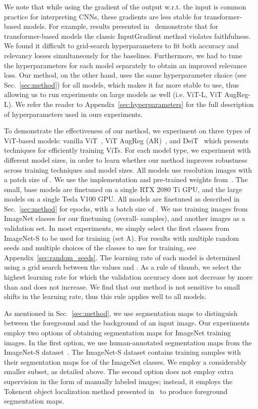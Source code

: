 \documentclass{article}
\begin{document}
We note that while using the gradient of the output w.r.t. the input is common practice for interpreting CNNs, these gradients are less stable for transformer-based models. For example, results presented in~\cite{Liu2022RethinkingAE} demonstrate that for transformer-based models the classic InputGradient method violates faithfulness. We found it difficult to grid-search hyperparameters to fit both accuracy and relevancy losses simultaneously for the baselines. Furthermore, we had to tune the hyperparameters for each model separately to obtain an improved relevance loss. Our method, on the other hand, uses the same hyperparameter choice (see Sec.~\ref{sec:method}) for all models, which makes it far more stable to use, thus allowing us to run experiments on large models as well (i.e. ViT-L, ViT AugReg-L). We refer the reader to Appendix~\ref{sec:hyperparameters} for the full description of hyperparameters used in ours experiments. 

 To demonstrate the effectiveness of our method, we experiment on three types of ViT-based models: vanilla ViT~\cite{dosovitskiy2020image}, ViT AugReg (AR)~\cite{Steiner2021HowTT}, and DeiT~\cite{Touvron2021TrainingDI} which presents techniques for efficiently training ViTs. For each model type, we experiment with different model sizes, in order to learn whether our method improves robustness across training techniques and model sizes. 
All models use  resolution images with a patch size of . We use the implementation and pre-trained weights from~\cite{rw2019timm}. The small, base models are finetuned on a single RTX 2080 Ti GPU, and the large models on a single Tesla V100 GPU. 
All models are finetuned as described in Sec.~\ref{sec:method} for  epochs, with a batch size of . We use  training images from  ImageNet classes for our finetuning (overall-  samples), and another  images as a validation set. In most experiments, we simply select the first  classes from ImageNet-S to be used for training (set A). For results with multiple random seeds and multiple choices of the  classes to use for training, see Appendix~\ref{sec:random_seeds}. The learning rate of each model is determined using a grid search between the values  and . As a rule of thumb, we select the highest learning rate for which the validation accuracy does not decrease by more than  and  does not increase. We find that our method is not sensitive to small shifts in the learning rate, thus this rule applies well to all models.

As mentioned in Sec.~\ref{sec:method}, we use segmentation maps to distinguish between the foreground and the background of an input image. Our experiments employ two options of obtaining segmentation maps for ImageNet training images. In the first option, we use human-annotated segmentation maps from the ImageNet-S dataset~\cite{gao2021luss}. The ImageNet-S dataset contains  training samples with their segmentation maps for  of the ImageNet classes. We employ a considerably smaller subset, as detailed above.
The second option does not employ extra supervision in the form of manually labeled images; instead, it employs the Tokencut object localization method presented in~\cite{wang2022tokencut} to produce foreground segmentation maps.
\end{document}
